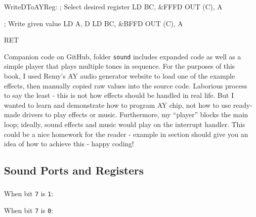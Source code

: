 \begin{tcblisting}{}
WriteDToAYReg:
	; Select desired register
	LD BC, &FFFD
	OUT (C), A
	
	; Write given value
	LD A, D
	LD BC, &BFFD
	OUT (C), A
	
	RET
\end{tcblisting}

Companion code on GitHub, folder {\tt sound} includes expanded code as well as a simple player that plays multiple tones in sequence. For the purposes of this book, I used Remy's AY audio generator website to load one of the example effects, then manually copied raw values into the source code. Laborious process to say the least - this is not how effects should be handled in real life. But I wanted to learn and demonstrate how to program AY chip, not how to use ready-made drivers to play effects or music. Furthermore, my ``player'' blocks the main loop; ideally, sound effects and music would play on the interrupt handler. This could be a nice homework for the reader - example in section  should give you an idea of how to achieve this - happy coding!


\pagebreak
\subsection{Sound Ports and Registers}
\label{zx_next_sound_registers}

\subsubsection{}

When bit {\tt 7} is {\tt 1}:

\begin{NextPort}
\end{NextPort}

When bit {\tt 7} is {\tt 0}:

\begin{NextPort}
\end{NextPort}


